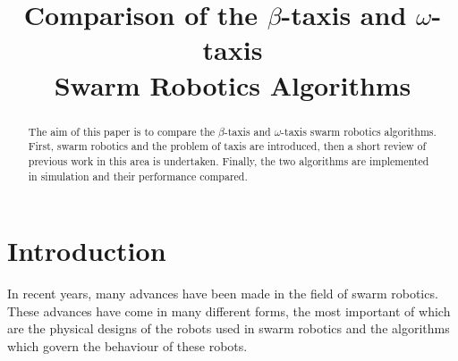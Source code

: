 \documentclass[conference]{IEEEtran}
\begin{document}
%
\title{Comparison of the $\beta$-taxis and $\omega$-taxis\\ Swarm Robotics Algorithms}


\author{}







\maketitle



\begin{abstract}
The aim of this paper is to compare the $\beta$-taxis and $\omega$-taxis swarm robotics algorithms. First, swarm robotics and the problem of taxis are introduced, then a short review of previous work in this area is undertaken. Finally, the two algorithms are implemented in simulation and their performance compared.
\end{abstract}


%

\section{Introduction}
In recent years, many advances have been made in the field of swarm robotics. These advances have come in many different forms, the most important of which are the physical designs of the robots used in swarm robotics and the algorithms which govern the behaviour of these robots.
\end{document}
